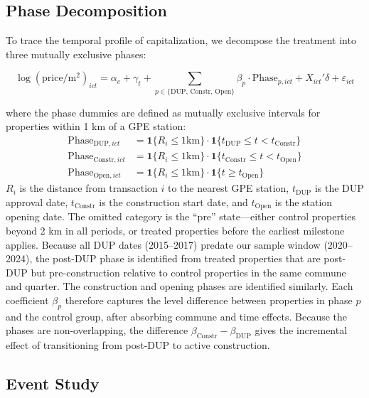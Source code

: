 \documentclass[12pt]{article}
\newcommand{\ind}{\mathbf{1}}
\begin{document}
\subsection{Phase Decomposition}

To trace the temporal profile of capitalization, we decompose the treatment into three mutually exclusive phases:

\begin{equation}
\label{eq:phase}
\log(\text{price}/\text{m}^2)_{ict} = \alpha_c + \gamma_t + \sum_{p \in \{\text{DUP, Constr, Open}\}} \beta_p \cdot \text{Phase}_{p,ict} + X_{ict}'\delta + \varepsilon_{ict}
\end{equation}

\noindent where the phase dummies are defined as mutually exclusive intervals for properties within 1 km of a GPE station:
\begin{align*}
\text{Phase}_{\text{DUP},ict} &= \ind\{R_i \leq 1\text{km}\} \cdot \ind\{t_{\text{DUP}} \leq t < t_{\text{Constr}}\} \\
\text{Phase}_{\text{Constr},ict} &= \ind\{R_i \leq 1\text{km}\} \cdot \ind\{t_{\text{Constr}} \leq t < t_{\text{Open}}\} \\
\text{Phase}_{\text{Open},ict} &= \ind\{R_i \leq 1\text{km}\} \cdot \ind\{t \geq t_{\text{Open}}\}
\end{align*}
$R_i$ is the distance from transaction $i$ to the nearest GPE station, $t_{\text{DUP}}$ is the DUP approval date, $t_{\text{Constr}}$ is the construction start date, and $t_{\text{Open}}$ is the station opening date. The omitted category is the ``pre'' state---either control properties beyond 2 km in all periods, or treated properties before the earliest milestone applies. Because all DUP dates (2015--2017) predate our sample window (2020--2024), the post-DUP phase is identified from treated properties that are post-DUP but pre-construction relative to control properties in the same commune and quarter. The construction and opening phases are identified similarly. Each coefficient $\beta_p$ therefore captures the level difference between properties in phase $p$ and the control group, after absorbing commune and time effects. Because the phases are non-overlapping, the difference $\beta_{\text{Constr}} - \beta_{\text{DUP}}$ gives the incremental effect of transitioning from post-DUP to active construction.

\subsection{Event Study}
\end{document}
